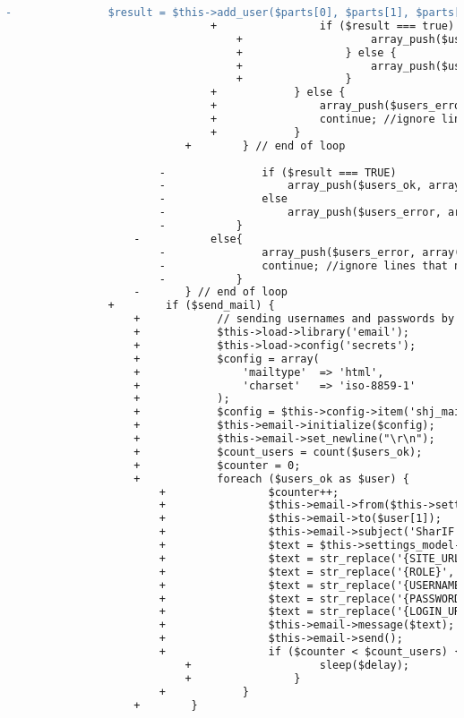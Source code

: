 \begin{lstlisting}[language=diff, caption=Perubahan pada kode User\_model.php]
								-				$result = $this->add_user($parts[0], $parts[1], $parts[2], $parts[3], $parts[4]);
								+                if ($result === true) {
									+                    array_push($users_ok, array($parts[0], $parts[1], $parts[2], $parts[3], $parts[4]));
									+                } else {
									+                    array_push($users_error, array($parts[0], $parts[1], $parts[2], $parts[3], $parts[4], $result));
									+                }
								+            } else {
								+                array_push($users_error, array($parts[0], $parts[1], $parts[2], $parts[3], $parts[4], 'Wrong Format'));
								+                continue; //ignore lines that not contain 5 parts
								+            }
							+        } // end of loop
						
						-				if ($result === TRUE)
						-					array_push($users_ok, array($parts[0], $parts[1], $parts[2], $parts[3], $parts[4]));
						-				else
						-					array_push($users_error, array($parts[0], $parts[1], $parts[2], $parts[3], $parts[4], $result));
						-			}
					-			else{
						-				array_push($users_error, array($parts[0], $parts[1], $parts[2], $parts[3], $parts[4], 'Wrong Format'));
						-				continue; //ignore lines that not contain 5 parts
						-			}
					-		} // end of loop
				+        if ($send_mail) {
					+            // sending usernames and passwords by email
					+            $this->load->library('email');
					+            $this->load->config('secrets');
					+            $config = array(
					+                'mailtype'  => 'html',
					+                'charset'   => 'iso-8859-1'
					+            );
					+            $config = $this->config->item('shj_mail');
					+            $this->email->initialize($config);
					+            $this->email->set_newline("\r\n");
					+            $count_users = count($users_ok);
					+            $counter = 0;
					+            foreach ($users_ok as $user) {
						+                $counter++;
						+                $this->email->from($this->settings_model->get_setting('mail_from'), $this->settings_model->get_setting('mail_from_name'));
						+                $this->email->to($user[1]);
						+                $this->email->subject('SharIF Judge Username and Password');
						+                $text = $this->settings_model->get_setting('add_user_mail');
						+                $text = str_replace('{SITE_URL}', base_url(), $text);
						+                $text = str_replace('{ROLE}', $user[4], $text);
						+                $text = str_replace('{USERNAME}', $user[0], $text);
						+                $text = str_replace('{PASSWORD}', htmlspecialchars($user[3]), $text);
						+                $text = str_replace('{LOGIN_URL}', base_url(), $text);
						+                $this->email->message($text);
						+                $this->email->send();
						+                if ($counter < $count_users) {
							+                    sleep($delay);
							+                }
						+            }
					+        }
				

\end{lstlisting}
